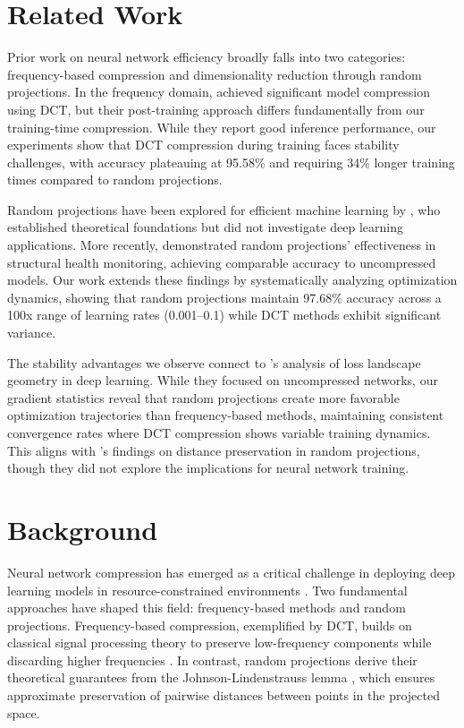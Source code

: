 \documentclass{article} %
\begin{document}
\section{Related Work}
\label{sec:related}

Prior work on neural network efficiency broadly falls into two categories: frequency-based compression and dimensionality reduction through random projections. In the frequency domain, \citet{wang2022learning} achieved significant model compression using DCT, but their post-training approach differs fundamentally from our training-time compression. While they report good inference performance, our experiments show that DCT compression during training faces stability challenges, with accuracy plateauing at 95.58\% and requiring 34\% longer training times compared to random projections.

Random projections have been explored for efficient machine learning by \citet{Hegde2007EfficientML}, who established theoretical foundations but did not investigate deep learning applications. More recently, \citet{azimi2020structural} demonstrated random projections' effectiveness in structural health monitoring, achieving comparable accuracy to uncompressed models. Our work extends these findings by systematically analyzing optimization dynamics, showing that random projections maintain 97.68\% accuracy across a 100x range of learning rates (0.001--0.1) while DCT methods exhibit significant variance.

The stability advantages we observe connect to \citet{Fort2020DeepLV}'s analysis of loss landscape geometry in deep learning. While they focused on uncompressed networks, our gradient statistics reveal that random projections create more favorable optimization trajectories than frequency-based methods, maintaining consistent convergence rates where DCT compression shows variable training dynamics. This aligns with \citet{Bingham2001RandomPI}'s findings on distance preservation in random projections, though they did not explore the implications for neural network training.

\section{Background}
\label{sec:background}

Neural network compression has emerged as a critical challenge in deploying deep learning models in resource-constrained environments \citep{Deng2020ModelCA}. Two fundamental approaches have shaped this field: frequency-based methods and random projections. Frequency-based compression, exemplified by DCT, builds on classical signal processing theory to preserve low-frequency components while discarding higher frequencies \citep{wang2022learning}. In contrast, random projections derive their theoretical guarantees from the Johnson-Lindenstrauss lemma \citep{Gupta1999AnEP}, which ensures approximate preservation of pairwise distances between points in the projected space.
\end{document}
